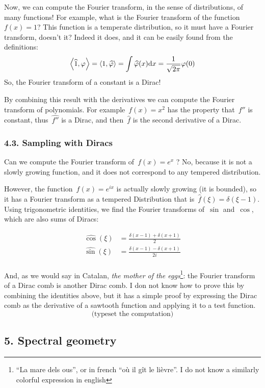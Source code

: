 Now, we can compute the Fourier transform, in the sense of
distributions, of many functions!  For example, what is the Fourier
transform of the function~$f(x)=1$?  This function is a temperate
distribution, so it must have a Fourier transform, doesn't it?
Indeed it does, and it can be easily found from the definitions:
$$
\left<\widehat{1},\varphi\right>
=
\left<1,\widehat{\varphi}\right>
=
\int\widehat{\varphi}(x)\mathrm{d} x
=
\frac{1}{\sqrt{2\pi}}\varphi(0)
$$
So, the Fourier transform of a constant is a Dirac!

By combining this result with the derivatives we can compute the
Fourier transform of polynomials.  For example~$f(x)=x^2$ has the
property that~$f''$ is constant, thus~$\widehat{f''}$ is a Dirac, and
then~$\widehat{f}$ is the second derivative of a Dirac.


\subsubsection{4.3. Sampling with Diracs}

Can we compute the Fourier transform of~$f(x)=e^x$ ?  No, because it
is not a slowly growing function, and it does not correspond to any
tempered distribution.

However, the function~$f(x)=e^{ix}$ is actually slowly growing (it is
bounded), so it has a Fourier transform as a tempered Distribution
that is~$\widehat{f}(\xi)=\delta(\xi-1)$.  Using trigonometric
identities, we find the Fourier transforms of~$\sin$ and~$\cos$,
which are also sums of Diracs:

\begin{eqnarray*}
	\widehat{\cos}(\xi) &=\frac{\delta(x-1)+\delta(x+1)}{2} \\
	\widehat{\sin}(\xi) &=\frac{\delta(x-1)-\delta(x+1)}{2i} \\
\end{eqnarray*}

And, as we would say in Catalan, \emph{the mother of the
eggs}\footnote{``La mare dels ous'', or in french ``où il gît le
lièvre''.  I do not know a similarly colorful expression in english}: the
Fourier transform of a Dirac comb is another Dirac comb.  I don not
know how to prove this by combining the identities above, but it has
a simple proof by expressing the Dirac comb as the derivative of a
sawtooth function and applying it to a test function.
$$
\textrm{(typeset the computation)}
$$

\subsection{5. Spectral geometry}

